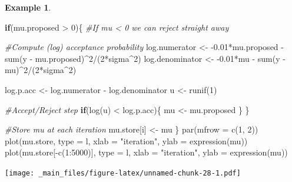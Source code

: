 \documentclass[
]{book}
\newenvironment{Shaded}{\begin{snugshade}}{\end{snugshade}}
\newcommand{\AttributeTok}[1]{\textcolor[rgb]{0.77,0.63,0.00}{#1}}
\newcommand{\CommentTok}[1]{\textcolor[rgb]{0.56,0.35,0.01}{\textit{#1}}}
\newcommand{\ControlFlowTok}[1]{\textcolor[rgb]{0.13,0.29,0.53}{\textbf{#1}}}
\newcommand{\DecValTok}[1]{\textcolor[rgb]{0.00,0.00,0.81}{#1}}
\newcommand{\FloatTok}[1]{\textcolor[rgb]{0.00,0.00,0.81}{#1}}
\newcommand{\FunctionTok}[1]{\textcolor[rgb]{0.00,0.00,0.00}{#1}}
\newcommand{\NormalTok}[1]{#1}
\newcommand{\OtherTok}[1]{\textcolor[rgb]{0.56,0.35,0.01}{#1}}
\newcommand{\SpecialCharTok}[1]{\textcolor[rgb]{0.00,0.00,0.00}{#1}}
\newcommand{\StringTok}[1]{\textcolor[rgb]{0.31,0.60,0.02}{#1}}
\theoremstyle{definition}
\theoremstyle{definition}
\newtheorem{example}{Example}[chapter]
\theoremstyle{definition}
\theoremstyle{definition}
\theoremstyle{remark}
\begin{document}
\begin{example}
\begin{Shaded}
\begin{Highlighting}[]
  \ControlFlowTok{if}\NormalTok{(mu.proposed }\SpecialCharTok{\textgreater{}} \DecValTok{0}\NormalTok{)\{ }\CommentTok{\#If mu \textless{} 0 we can reject straight away}
    
    \CommentTok{\#Compute (log) acceptance probability}
\NormalTok{    log.numerator   }\OtherTok{\textless{}{-}} \SpecialCharTok{{-}}\FloatTok{0.01}\SpecialCharTok{*}\NormalTok{mu.proposed }\SpecialCharTok{{-}} \FunctionTok{sum}\NormalTok{(y }\SpecialCharTok{{-}}\NormalTok{ mu.proposed)}\SpecialCharTok{\^{}}\DecValTok{2}\SpecialCharTok{/}\NormalTok{(}\DecValTok{2}\SpecialCharTok{*}\NormalTok{sigma}\SpecialCharTok{\^{}}\DecValTok{2}\NormalTok{)}
\NormalTok{    log.denominator }\OtherTok{\textless{}{-}} \SpecialCharTok{{-}}\FloatTok{0.01}\SpecialCharTok{*}\NormalTok{mu }\SpecialCharTok{{-}} \FunctionTok{sum}\NormalTok{(y }\SpecialCharTok{{-}}\NormalTok{ mu)}\SpecialCharTok{\^{}}\DecValTok{2}\SpecialCharTok{/}\NormalTok{(}\DecValTok{2}\SpecialCharTok{*}\NormalTok{sigma}\SpecialCharTok{\^{}}\DecValTok{2}\NormalTok{)}
    
\NormalTok{    log.p.acc }\OtherTok{\textless{}{-}}\NormalTok{ log.numerator }\SpecialCharTok{{-}}\NormalTok{ log.denominator}
\NormalTok{    u }\OtherTok{\textless{}{-}} \FunctionTok{runif}\NormalTok{(}\DecValTok{1}\NormalTok{)}
    
    \CommentTok{\#Accept/Reject step}
    \ControlFlowTok{if}\NormalTok{(}\FunctionTok{log}\NormalTok{(u) }\SpecialCharTok{\textless{}}\NormalTok{ log.p.acc)\{}
\NormalTok{      mu }\OtherTok{\textless{}{-}}\NormalTok{ mu.proposed}
\NormalTok{    \}}
\NormalTok{  \}}
  
  \CommentTok{\#Store mu at each iteration}
\NormalTok{  mu.store[i] }\OtherTok{\textless{}{-}}\NormalTok{ mu}
\NormalTok{\}}
\FunctionTok{par}\NormalTok{(}\AttributeTok{mfrow =} \FunctionTok{c}\NormalTok{(}\DecValTok{1}\NormalTok{, }\DecValTok{2}\NormalTok{))}
\FunctionTok{plot}\NormalTok{(mu.store, }\AttributeTok{type =} \StringTok{\textquotesingle{}l\textquotesingle{}}\NormalTok{, }\AttributeTok{xlab =} \StringTok{"iteration"}\NormalTok{, }\AttributeTok{ylab =} \FunctionTok{expression}\NormalTok{(mu))}
\FunctionTok{plot}\NormalTok{(mu.store[}\SpecialCharTok{{-}}\FunctionTok{c}\NormalTok{(}\DecValTok{1}\SpecialCharTok{:}\DecValTok{5000}\NormalTok{)], }\AttributeTok{type =} \StringTok{\textquotesingle{}l\textquotesingle{}}\NormalTok{, }\AttributeTok{xlab =} \StringTok{"iteration"}\NormalTok{, }\AttributeTok{ylab =} \FunctionTok{expression}\NormalTok{(mu))}
\end{Highlighting}
\end{Shaded}

\texttt{[image: \_main\_files/figure-latex/unnamed-chunk-28-1.pdf]}
\end{example}
\end{document}
